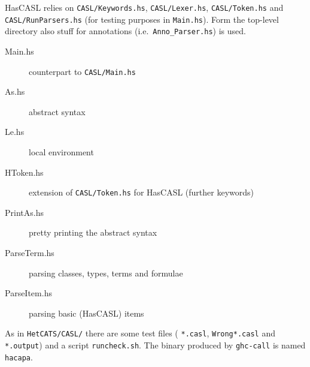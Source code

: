 \documentclass{article}
\begin{document}
HasCASL relies on \texttt{CASL/Keywords.hs}, \texttt{CASL/Lexer.hs},
\texttt{CASL/Token.hs} and \texttt{CASL/RunParsers.hs} (for testing
purposes in \texttt{Main.hs}). Form the top-level directory also stuff
for annotations (i.e.\ \texttt{Anno\_Parser.hs}) is used.

\begin{description}
\item[Main.hs] counterpart to \texttt{CASL/Main.hs} 
\item[As.hs] abstract syntax
\item[Le.hs] local environment
\item[HToken.hs] extension of \texttt{CASL/Token.hs} for HasCASL
  (further keywords)
\item[PrintAs.hs] pretty printing the abstract syntax
\item[ParseTerm.hs] parsing classes, types, terms and formulae
\item[ParseItem.hs] parsing basic (HasCASL) items
\end{description}

As in \texttt{HetCATS/CASL/} there are some test files (
\texttt{*.casl}, \texttt{Wrong*.casl} and \texttt{*.output}) and a
script \texttt{runcheck.sh}. The binary produced by \texttt{ghc-call}
is named \texttt{hacapa}.
\end{document}
